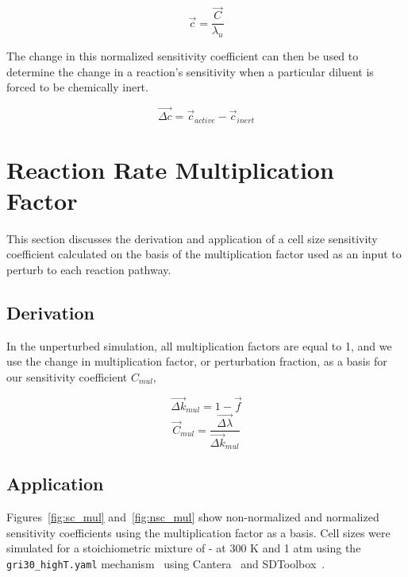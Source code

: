 \documentclass{article}
\begin{document}
\begin{equation}
    \label{eq:nsc_base}
    \overrightarrow{c} = \frac{\overrightarrow{C}}{\lambda_{u}}
\end{equation}

The change in this normalized sensitivity coefficient can then be used to determine the change in a reaction's sensitivity when a particular diluent is forced to be chemically inert.

\begin{equation}
    \label{eq:delta_nsc_inert}
    \overrightarrow{\Delta c} = \overrightarrow{c}_{active} - \overrightarrow{c}_{inert}
\end{equation}

\section{Reaction Rate Multiplication Factor}
\label{sec:mul_approach}

This section discusses the derivation and application of a cell size sensitivity coefficient calculated on the basis of the multiplication factor used as an input to perturb to each reaction pathway.

\subsection{Derivation}\label{subsec:sec:mul_derivation}

In the unperturbed simulation, all multiplication factors are equal to 1, and we use the change in multiplication factor, or perturbation fraction, as a basis for our sensitivity coefficient $C_{mul}$,

\begin{equation}
    \label{eq:delta_k_mul}
    \overrightarrow{\Delta k}_{mul} = 1 - \overrightarrow{f}
\end{equation}
\begin{equation}
    \label{eq:sc_mul}
    \overrightarrow{C}_{mul} = \frac{\overrightarrow{\Delta \lambda}}{\overrightarrow{\Delta k}_{mul}}
\end{equation}

\subsection{Application}\label{subsec:mul_application}

Figures~\ref{fig:sc_mul} and~\ref{fig:nsc_mul} show non-normalized and normalized sensitivity coefficients using the multiplication factor as a basis.
Cell sizes were simulated for a stoichiometric mixture of - at 300 K and 1 atm using the \texttt{gri30\_highT.yaml} mechanism~\cite{gri3,caltech_mech_list} using Cantera~\cite{cantera} and SDToolbox~\cite{sdtoolbox}.
\end{document}
